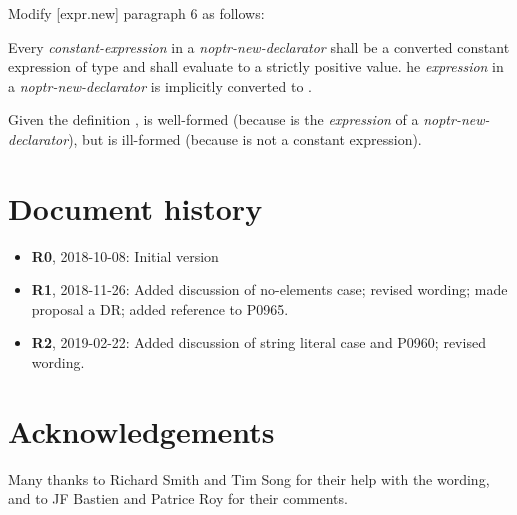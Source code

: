 Modify [expr.new] paragraph 6 as follows:

\begin{adjustwidth}{0.9cm}{0.9cm}
Every \emph{constant-expression} in a \emph{noptr-new-declarator} shall be a converted constant expression of type  and shall evaluate to a strictly positive value. he \emph{expression} in a \emph{noptr-new-declarator} is implicitly converted to . \begin{example}
Given the definition ,  is well-formed (because  is the \emph{expression} of a \emph{noptr-new-declarator}), but  is ill-formed (because  is not a constant expression). \end{example} 

\end{adjustwidth}

\section*{Document history}

\begin{itemize}
\item \textbf{R0}, 2018-10-08: Initial version
\item \textbf{R1}, 2018-11-26: Added discussion of no-elements case; revised wording; made proposal a DR; added reference to P0965.
\item \textbf{R2}, 2019-02-22: Added discussion of string literal case and P0960; revised wording.
\end{itemize}

\section*{Acknowledgements}

Many thanks to Richard Smith and Tim Song for their help with the wording, and to JF Bastien and Patrice Roy for their comments.

\renewcommand{\bibname}{References}



